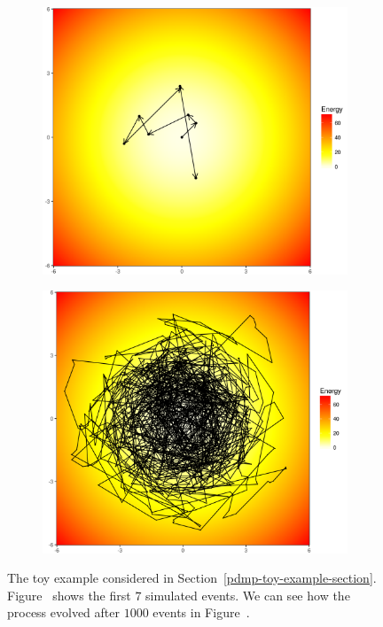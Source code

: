 \documentclass[report.tex]{subfiles}
\begin{document}
\begin{figure}
  \begin{subfigure}{.5\textwidth}
    \includegraphics[width=\textwidth]{img/ch2-pdmp-simple}
    \caption{}
    \label{image-pdmp-simple-short}
  \end{subfigure}
  \begin{subfigure}{.5\textwidth}
    \includegraphics[width=\textwidth]{img/ch2-pdmp-simple-gaussian}
    \caption{}
    \label{image-pdmp-simple-gaussian}
  \end{subfigure}
  \caption{The toy example considered in Section~\ref{pdmp-toy-example-section}.
    Figure~ shows the first $7$ simulated events.
    We can see how the process evolved after $1000$ events in
    Figure~.}
  \label{image-pdmp-simple}
\end{figure}
\end{document}

